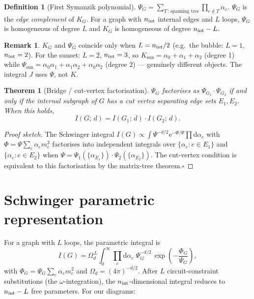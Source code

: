 \documentclass[10pt,a4paper,twocolumn]{article}
\theoremstyle{plain}
\newtheorem{theorem}{Theorem}
\theoremstyle{definition}
\newtheorem{definition}{Definition}
\newtheorem{remark}{Remark}
\newcommand{\dd}{\mathrm{d}}
\newcommand{\ee}{\mathrm{e}}
\renewcommand{\Psi}{\varPsi}
\renewcommand{\Phi}{\varPhi}
\begin{document}
\begin{definition}[First Symanzik polynomial]
$\Psi_G = \sum_{T\,:\,\text{spanning tree}} \prod_{e \notin T} \alpha_e$.
$\Psi_G$ is the \emph{edge complement} of $K_G$.
For a graph with $n_{\rm int}$ internal edges and $L$ loops,
$\Psi_G$ is homogeneous of degree $L$ and
$K_G$ is homogeneous of degree $n_{\rm int} - L$.
\end{definition}

\begin{remark}
$K_G$ and $\Psi_G$ coincide only when $L = n_{\rm int}/2$
(e.g.\ the bubble: $L=1$, $n_{\rm int}=2$).
For the sunset: $L=2$, $n_{\rm int}=3$, so
$K_{\text{sun}} = \alpha_0+\alpha_1+\alpha_2$ (degree 1) while
$\Psi_{\text{sun}} = \alpha_0\alpha_1+\alpha_1\alpha_2+\alpha_0\alpha_2$
(degree 2) --- genuinely different objects.
The integral $J$ uses $\Psi$, not $K$.
\end{remark}

\begin{theorem}[Bridge / cut-vertex factorisation]
\label{thm:bridge}
$\Psi_G$ factorises as $\Psi_{G_1}\cdot\Psi_{G_2}$ if and only if
the internal subgraph of $G$ has a cut vertex separating edge sets
$E_1, E_2$.  When this holds,
\[
  I(G;\,d) = I(G_1;\,d)\cdot I(G_2;\,d).
\]
\end{theorem}
\begin{proof}[Proof sketch]
The Schwinger integral $I(G) \propto \int\!
\Psi^{-d/2}\ee^{-\Phi/\Psi}\prod\dd\alpha_e$
with $\Phi = \Psi\sum_e\alpha_e m_e^2$ factorises into independent
integrals over $\{\alpha_e : e \in E_1\}$ and $\{\alpha_e : e \in E_2\}$
when $\Psi = \Psi_1(\{\alpha_{E_1}\})\cdot\Psi_2(\{\alpha_{E_2}\})$.
The cut-vertex condition is equivalent to this factorisation by
the matrix-tree theorem.\hfill$\square$
\end{proof}

\section{Schwinger parametric representation}
\label{sec:schwinger}

For a graph with $L$ loops, the parametric integral is
\begin{equation}\label{eq:schwinger}
  I(G) = \Omega_d^{\,L}\!\!
    \int_0^\infty\!\!\prod_{e}\!\dd\alpha_e\;
    \Psi_G^{-d/2}\,
    \exp\!\left(-\frac{\Phi_G}{\Psi_G}\right),
\end{equation}
with $\Phi_G = \Psi_G\sum_e\alpha_e m_e^2$ and
$\Omega_d = (4\pi)^{-d/2}$.
After $L$ circuit-constraint substitutions (the $\omega$-integration),
the $n_{\rm int}$-dimensional integral reduces to
$n_{\rm int} - L$ free parameters.  For our diagrams:
\end{document}
